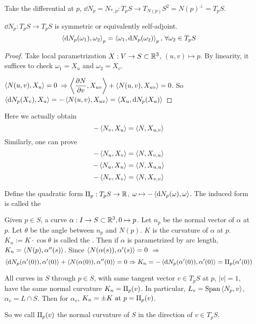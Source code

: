 Take the differential at  $ p $,  $ \dd N_p=N_{*,p}:T_pS\rightarrow T_{N(p)}S^2=N(p)^{\perp}=T_pS $.

\begin{proposition}
     $ \dd N_p:T_pS\rightarrow T_pS $ is symmetric or equivalently self-adjoint. \ie 
     \[\left<\mathrm{d} N_p(\omega_1),\omega_2\right>_p=\left<\omega_1,\mathrm{d} N_p(\omega_2)\right>_p,\,\forall \omega_2 \in T_pS\]
\end{proposition}
\begin{proof}
    Take local parametrization $ X :V\rightarrow S\subset \mathbb R^3 $,  $ (u,v)\mapsto p $.
    By linearity, it suffices to check  $ \omega_1=X_u $ and  $ \omega_2=X_v $.
    
     $ \left<N(u,v),X_u\right>=0 $  $ \Rightarrow\left<\displaystyle\frac{\partial N }{\partial v},X_{uv}\right>+\left<N(u,v),X_{uv}\right>=0 $. So  $ \left<\mathrm{d} N_p(X_v),X_u\right>=-\left<N(u,v),X_{uv}\right>=\left<X_u,\mathrm{d} N_p(X_u)\right> $ 
\end{proof}
\begin{remark}\label{remark1}
    Here we actually obtain 
    \[-\left<N_v,X_u\right>=\left<N,X_{u,v}\right>\]
    Similarly, one can prove
    \[-\left<N_u,X_v\right>=\left<N,X_{v,u}\right>\]
    \[-\left<N_u,X_u\right>=\left<N,X_{u,u}\right>\]
    \[-\left<N_v,X_v\right>=\left<N,X_{v,v}\right>\]
\end{remark}
Define the quadratic form  $ \Romannumer2_p:T_pS\rightarrow \Rbb $,  $ \omega\mapsto -\left<\mathrm{d} N_p(\omega),\omega\right> $. The induced form is  called the   

\begin{definition}
    Given  $ p\in S $, a curve  $ \alpha:I\rightarrow S\subset \mathbb R^3, 0\mapsto p $. Let  $ n_p  $ be the normal vector of  $ \alpha  $ at  $ p  $. Let  $ \theta $ be the angle between  $ n_p $ and  $ N(p) $.  $ K  $ is the curvature of  $ \alpha  $ at  $ p $.  $ K_n:=K\cdot\cos\theta $ is called the . Then if  $ \alpha $ is parametrized by arc length,  $ K_n=\left<N(p),\alpha''(s)\right> $. Since $ \left<N(\alpha(s)),\alpha'(s)\right>=0 $ $ \Rightarrow $ 
    \[\<\dd N_p(\alpha'(0)),\alpha'(0)\>+\<N(\alpha(0)),\alpha''(0)\>=0\Rightarrow K_n=-\<\dd N_p(\alpha'(0)),\alpha'(0)\>=\Romannumer2_p(\alpha'(0))\]

    
\end{definition}
\begin{theorem}[Meusnier]\label{Meusnier theorem}
    All curves in  $ S $ through  $ p\in S $, with same tangent vector  $ v\in T_pS $ at  $ p $,  $ |v|=1 $, have the same normal curvature  $ K_n=\Romannumer2_p(v) $. In particular,  $ L_v=\mathrm{Span}\left<N_p,v\right> $,  $ \alpha_v=L\cap S $. Then for  $ \alpha_v $,  $ K_n=\pm K\text{ at }p=\Romannumer2_p(v) $. 
    
    So we call  $ \Romannumer2_p(v) $ the normal curvature of  $ S $ in the direction of  $ v\in T_pS $.  
\end{theorem}
